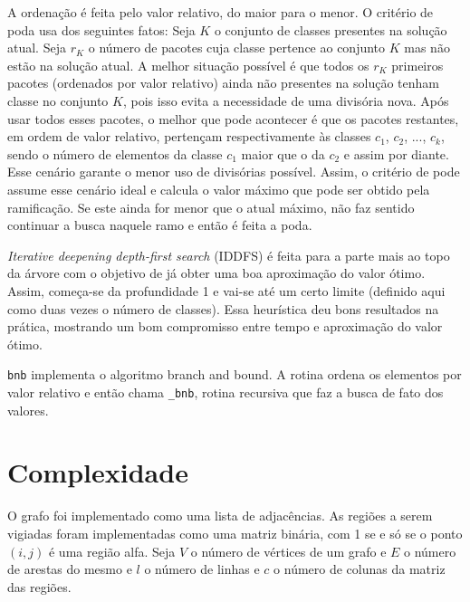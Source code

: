 \documentclass[7pt]{article}
\newcommand{\tit}[1]{\textit{#1}}
\newcommand{\ttt}[1]{\texttt{#1}}
\begin{document}
{\begin{multicols}{2}
A ordenação é feita pelo valor relativo, do maior para o menor.
O critério de poda usa dos seguintes fatos:
Seja $K$ o conjunto de classes presentes na solução atual.
Seja $r_K$ o número de pacotes cuja classe pertence ao conjunto $K$ mas não
estão na solução atual.
A melhor situação possível é que todos os $r_K$ primeiros pacotes (ordenados
por valor relativo) ainda não presentes na solução tenham classe no conjunto
$K$, pois isso evita a necessidade de uma divisória nova.
Após usar todos esses pacotes, o melhor que pode acontecer é que os pacotes
restantes, em ordem de valor relativo, pertençam respectivamente às
classes $c_1$, $c_2$, ..., $c_k$, sendo o número de elementos da classe
$c_1$ maior que o da $c_2$ e assim por diante.
Esse cenário garante o menor uso de divisórias possível.
Assim, o critério de pode assume esse cenário ideal e calcula o valor
máximo que pode ser obtido pela ramificação.
Se este ainda for menor que o atual máximo, não faz sentido continuar a
busca naquele ramo e então é feita a poda.

\tit{Iterative deepening depth-first search} (IDDFS) é feita para a parte
mais ao topo da árvore com o objetivo de já obter uma boa aproximação
do valor ótimo.
Assim, começa-se da profundidade 1 e vai-se até um certo limite
(definido aqui como duas vezes o número de classes).
Essa heurística deu bons resultados na prática, mostrando um bom compromisso
entre tempo e aproximação do valor ótimo.

\ttt{bnb} implementa o algoritmo branch and bound. A rotina ordena os
elementos por valor relativo e então chama \ttt{\_bnb}, rotina recursiva que
faz a busca de fato dos valores.

\section{Complexidade}
O grafo foi implementado como uma lista de adjacências.
As regiões a serem vigiadas foram implementadas como uma matriz binária, com
1 se e só se o ponto $(i, j)$ é uma região alfa.
Seja $V$ o número de vértices de um grafo e $E$ o número de arestas do mesmo e
$l$ o número de linhas e $c$ o número de colunas da matriz das regiões.


\end{multicols}}
\end{document}
